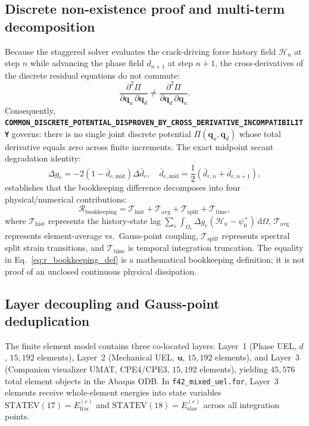 \subsection{Discrete non-existence proof and multi-term decomposition}
Because the staggered solver evaluates the crack-driving force history field $\mathcal{H}_n$ at step $n$ while advancing the phase field $d_{n+1}$ at step $n+1$, the cross-derivatives of the discrete residual equations do not commute:
\begin{equation}
  \frac{\partial^2 \Pi}{\partial \mathbf{q}_u\,\partial \mathbf{q}_d} \ne \frac{\partial^2 \Pi}{\partial \mathbf{q}_d\,\partial \mathbf{q}_u}.
\end{equation}
Consequently, \textbf{\texttt{COMMON\_DISCRETE\_POTENTIAL\_DISPROVEN\_BY\_CROSS\_DERIVATIVE\_INCOMPATIBILITY}} governs: there is no single joint discrete potential $\Pi(\mathbf{q}_u, \mathbf{q}_d)$ whose total derivative equals zero across finite increments. The exact midpoint secant degradation identity:
\begin{equation}
  \Delta g_e = -2\left(1 - \bar{d}_{e, \mathrm{mid}}\right)\Delta \bar{d}_e, \quad \bar{d}_{e, \mathrm{mid}} = \frac{1}{2}\left( \bar{d}_{e, n} + \bar{d}_{e, n+1} \right),
\end{equation}
establishes that the bookkeeping difference decomposes into four physical/numerical contributions:
\begin{equation}
  \mathcal{R}_{\mathrm{bookkeeping}} = \mathcal{T}_{\mathrm{hist}} + \mathcal{T}_{\mathrm{avg}} + \mathcal{T}_{\mathrm{split}} + \mathcal{T}_{\mathrm{time}},
  \label{eq:decomp_4term}
\end{equation}
where $\mathcal{T}_{\mathrm{hist}}$ represents the history-state lag $\sum_e \int_{\Omega_e} \Delta g_e (\mathcal{H}_{n} - \psi_0^+)\,\mathrm{d}\Omega$, $\mathcal{T}_{\mathrm{avg}}$ represents element-average vs.\ Gauss-point coupling, $\mathcal{T}_{\mathrm{split}}$ represents spectral split strain transitions, and $\mathcal{T}_{\mathrm{time}}$ is temporal integration truncation. The equality in Eq.~\eqref{eq:r_bookkeeping_def} is a mathematical bookkeeping definition; it is not proof of an unclosed continuous physical dissipation.

\subsection{Layer decoupling and Gauss-point deduplication}
The finite element model contains three co-located layers: Layer~1 (Phase UEL, $d$, $15{,}192$ elements), Layer~2 (Mechanical UEL, $\mathbf{u}$, $15{,}192$ elements), and Layer~3 (Companion visualizer UMAT, CPE4/CPE3, $15{,}192$ elements), yielding $45{,}576$ total element objects in the Abaqus ODB. In \nolinkurl{f42_mixed_uel.for}, Layer~3 elements receive whole-element energies into state variables $\mathrm{STATEV}(17) = E_{\mathrm{frac}}^{(e)}$ and $\mathrm{STATEV}(18) = E_{\mathrm{elas}}^{(e)}$ across all integration points.

